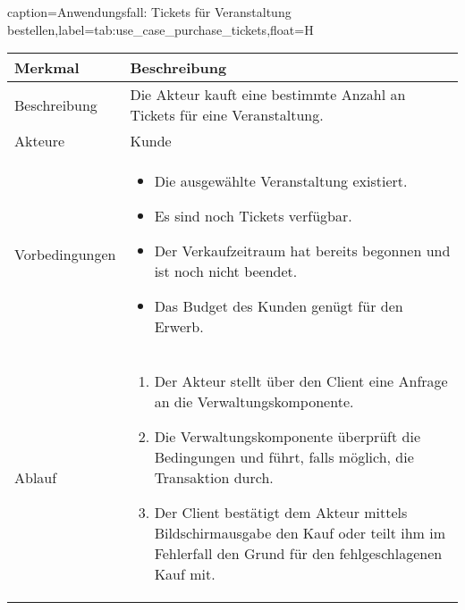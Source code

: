 \begin{dhbwtable}{caption={Anwendungsfall: Tickets für Veranstaltung bestellen},label=tab:use_case_purchase_tickets,float=H}
    \begin{tabularx}{\textwidth}{lX}
        \toprule
        \textbf{Merkmal} & \textbf{Beschreibung}  \\ \midrule
        Beschreibung    &  Die Akteur kauft eine bestimmte Anzahl an Tickets für eine Veranstaltung. \\
        Akteure         &  Kunde \\
        Vorbedingungen  &  \begin{minipage}[t]{\linewidth}
        \vspace*{-3mm}
        \begin{itemize}[leftmargin=*,nosep,after=\strut]
            \item Die ausgewählte Veranstaltung existiert.
            \item Es sind noch Tickets verfügbar.
            \item Der Verkaufzeitraum hat bereits begonnen und ist noch nicht beendet.
            \item Das Budget des Kunden genügt für den Erwerb.
        \end{itemize}
        \end{minipage} \\
        Ablauf          & \begin{minipage}[t]{\linewidth}
        \vspace*{-3mm}
        \begin{enumerate}[leftmargin=*,nosep,after=\strut]
            \item Der Akteur stellt über den Client eine Anfrage an die Verwaltungskomponente.
            \item Die Verwaltungskomponente überprüft die Bedingungen und führt, falls möglich, die Transaktion durch.
            \item Der Client bestätigt dem Akteur mittels Bildschirmausgabe den Kauf oder teilt ihm im Fehlerfall den Grund für den fehlgeschlagenen Kauf mit.
        \end{enumerate}
        \end{minipage} \\\bottomrule
    \end{tabularx}    
\end{dhbwtable}

